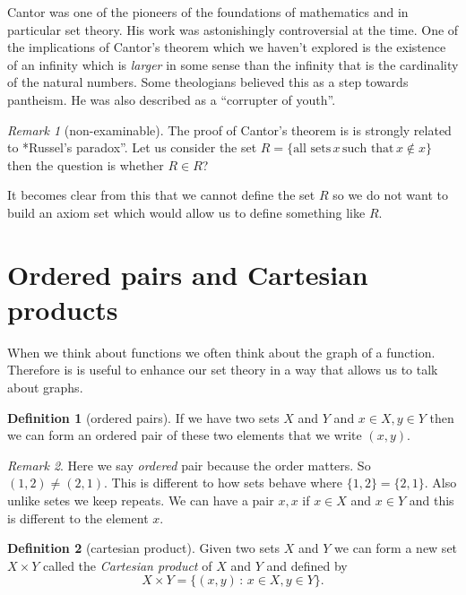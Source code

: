 \documentclass[
]{book}
\theoremstyle{definition}
\newtheorem{definition}{Definition}[chapter]
\theoremstyle{definition}
\theoremstyle{definition}
\theoremstyle{definition}
\theoremstyle{remark}
\newtheorem*{remark}{Remark}
\begin{document}
Cantor was one of the pioneers of the foundations of mathematics and in particular set theory. His work was astonishingly controversial at the time. One of the implications of Cantor's theorem which we haven't explored is the existence of an infinity which is \emph{larger} in some sense than the infinity that is the cardinality of the natural numbers. Some theologians believed this as a step towards pantheism. He was also described as a ``corrupter of youth''.

\begin{remark}[non-examinable]
The proof of Cantor's theorem is is strongly related to *Russel's paradox''. Let us consider the set \(R= \{ \mbox{all sets}\, x \,\mbox{such that} \, x \notin x \}\) then the question is whether \(R \in R\)?

It becomes clear from this that we cannot define the set \(R\) so we do not want to build an axiom set which would allow us to define something like \(R\).
\end{remark}

\section{Ordered pairs and Cartesian products}\label{ordered-pairs-and-cartesian-products}

When we think about functions we often think about the graph of a function. Therefore is is useful to enhance our set theory in a way that allows us to talk about graphs.

\begin{definition}[ordered pairs]
If we have two sets \(X\) and \(Y\) and \(x \in X, y \in Y\) then we can form an ordered pair of these two elements that we write \((x,y)\).
\end{definition}

\begin{remark}
Here we say \emph{ordered} pair because the order matters. So \((1,2) \neq (2,1)\). This is different to how sets behave where \(\{1,2\} = \{2,1\}\). Also unlike setes we keep repeats. We can have a pair \(x,x\) if \(x \in X\) and \(x \in Y\) and this is different to the element \(x\).
\end{remark}

\begin{definition}[cartesian product]
Given two sets \(X\) and \(Y\) we can form a new set \(X \times Y\) called the \emph{Cartesian product} of \(X\) and \(Y\) and defined by
\[ X \times Y = \{ (x,y) \,:\, x \in X, y \in Y\}.  \]
\end{definition}
\end{document}

